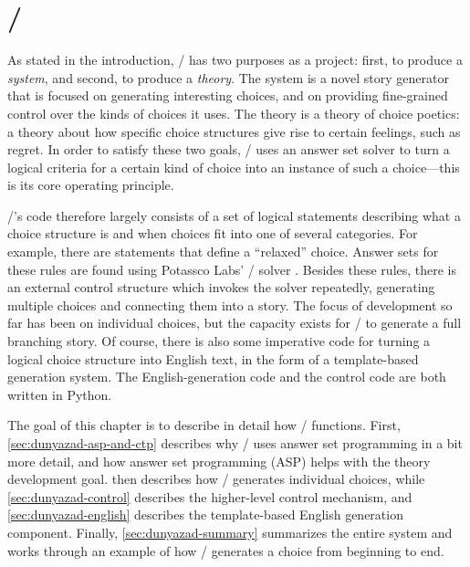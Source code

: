 \chapter{\dunyazad/}

\label{ch:dunyazad}%

As stated in the introduction, \dunyazad/ has two purposes as a project: first, to produce a \emph{system}, and second, to produce a \emph{theory}.
%
The system is a novel story generator that is focused on generating interesting choices, and on providing fine-grained control over the kinds of choices it uses.
%
The theory is a theory of choice poetics: a theory about how specific choice structures give rise to certain feelings, such as regret.
%
In order to satisfy these two goals, \dunyazad/ uses an answer set solver to turn a logical criteria for a certain kind of choice into an instance of such a choice---this is its core operating principle.


\dunyazad/'s code therefore largely consists of a set of logical statements describing what a choice structure is and when choices fit into one of several categories.
%
For example, there are statements that define a ``relaxed'' choice.
%
Answer sets for these rules are found using Potassco Labs' \clingo/ solver \citep{Gebser2011}.
%
Besides these rules, there is an external control structure which invokes the solver repeatedly, generating multiple choices and connecting them into a story.
%
The focus of development so far has been on individual choices, but the capacity exists for \dunyazad/ to generate a full branching story.
%
Of course, there is also some imperative code for turning a logical choice structure into English text, in the form of a template-based generation system.
%
The English-generation code and the control code are both written in Python.


The goal of this chapter is to describe in detail how \dunyazad/ functions.
%
First, \cref{sec:dunyazad-asp-and-ctp} describes why \dunyazad/ uses answer set programming in a bit more detail, and how answer set programming (ASP) helps with the theory development goal.
%
 then describes how \dunyazad/ generates individual choices, while \cref{sec:dunyazad-control} describes the higher-level control mechanism, and \cref{sec:dunyazad-english} describes the template-based English generation component.
%
Finally, \cref{sec:dunyazad-summary} summarizes the entire system and works through an example of how \dunyazad/ generates a choice from beginning to end.

